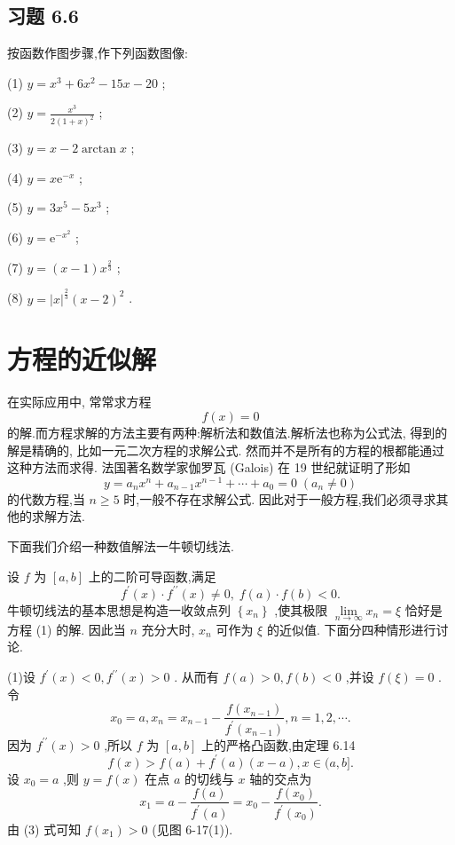 \subsection{习题 6.6}

按函数作图步骤,作下列函数图像:

(1) \(y = {x}^{3} + 6{x}^{2} - {15x} - {20}\) ;

(2) \(y = \frac{{x}^{3}}{2{\left( 1 + x\right) }^{2}}\) ;

(3) \(y = x - 2\arctan x\) ;

(4) \(y = x{\mathrm{e}}^{-x}\) ;

(5) \(y = 3{x}^{5} - 5{x}^{3}\) ;

(6) \(y = {\mathrm{e}}^{-{x}^{2}}\) ;

(7) \(y = \left( {x - 1}\right) {x}^{\frac{2}{3}}\) ;

(8) \(y = {\left| x\right| }^{\frac{2}{3}}{\left( x - 2\right) }^{2}\) .

\section{方程的近似解}

在实际应用中, 常常求方程
\[
f\left( x\right)  = 0 \tag{1}
\]
的解.而方程求解的方法主要有两种:解析法和数值法.解析法也称为公式法, 得到的解是精确的, 比如一元二次方程的求解公式. 然而并不是所有的方程的根都能通过这种方法而求得. 法国著名数学家伽罗瓦 (Galois) 在 19 世纪就证明了形如
\[
y = {a}_{n}{x}^{n} + {a}_{n - 1}{x}^{n - 1} + \cdots  + {a}_{0} = 0\;\left( {{a}_{n} \neq  0}\right)
\]
的代数方程,当 \(n \geq  5\) 时,一般不存在求解公式. 因此对于一般方程,我们必须寻求其他的求解方法.

下面我们介绍一种数值解法一牛顿切线法.

设 \(f\) 为 \(\left\lbrack  {a,b}\right\rbrack\) 上的二阶可导函数,满足
\[
{f}^{\prime }\left( x\right)  \cdot  {f}^{\prime \prime }\left( x\right)  \neq  0,\;f\left( a\right)  \cdot  f\left( b\right)  < 0.
\]
牛顿切线法的基本思想是构造一收敛点列 \(\left\{  {x}_{n}\right\}\) ,使其极限 \(\mathop{\lim }\limits_{{n \rightarrow  \infty }}{x}_{n} = \xi\) 恰好是方程 (1) 的解. 因此当 \(n\) 充分大时, \({x}_{n}\) 可作为 \(\xi\) 的近似值. 下面分四种情形进行讨论.

(1)设 \({f}^{\prime }\left( x\right)  < 0,{f}^{\prime \prime }\left( x\right)  > 0\) . 从而有 \(f\left( a\right)  > 0,f\left( b\right)  < 0\) ,并设 \(f\left( \xi \right)  = 0\) . 令
\[
{x}_{0} = a,{x}_{n} = {x}_{n - 1} - \frac{f\left( {x}_{n - 1}\right) }{{f}^{\prime }\left( {x}_{n - 1}\right) },n = 1,2,\cdots . \tag{2}
\]
因为 \({f}^{\prime \prime }\left( x\right)  > 0\) ,所以 \(f\) 为 \(\left\lbrack  {a,b}\right\rbrack\) 上的严格凸函数,由定理 6.14
\[
f\left( x\right)  > f\left( a\right)  + {f}^{\prime }\left( a\right) \left( {x - a}\right) ,x \in  (a,b\rbrack . \tag{3}
\]
设 \({x}_{0} = a\) ,则 \(y = f\left( x\right)\) 在点 \(a\) 的切线与 \(x\) 轴的交点为
\[
{x}_{1} = a - \frac{f\left( a\right) }{{f}^{\prime }\left( a\right) } = {x}_{0} - \frac{f\left( {x}_{0}\right) }{{f}^{\prime }\left( {x}_{0}\right) }.
\]
由 (3) 式可知 \(f\left( {x}_{1}\right)  > 0\) (见图 6-17(1)).

